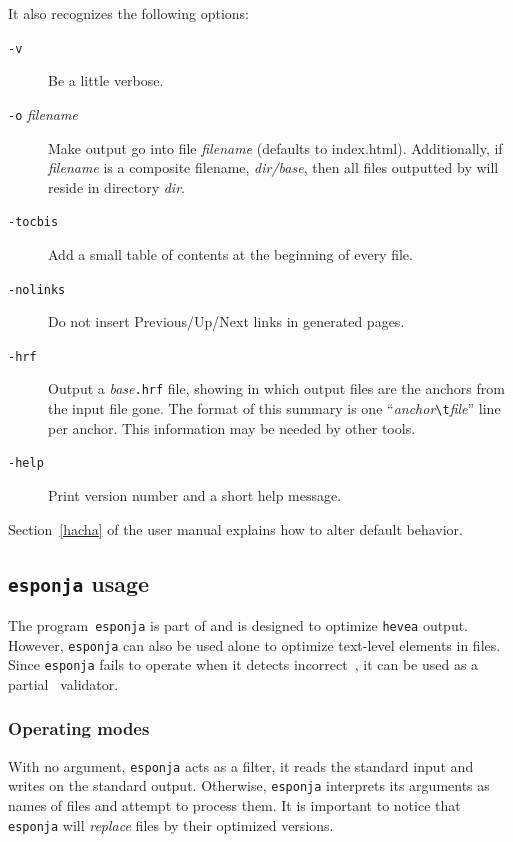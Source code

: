 It also recognizes the following options:
\begin{description}
\item[{\tt -v}] Be a little verbose.
\item[{\tt -o} {\it filename}] Make \hacha{} output go into file
\textit{filename} (defaults  to index.html).
Additionally, if \textit{filename} is a composite filename,
\textit{dir/base}, then all files outputted by \hacha{} will
reside in directory \textit{dir}.
\item[{\tt -tocbis}] Add a small table of contents at the beginning of every file.
\item[{\tt -nolinks}] Do not insert Previous/Up/Next links in
generated pages.
\item[{\tt -hrf}] Output a \textit{base}\texttt{.hrf} file, showing
in which output files are the anchors from the input file gone.
The format of this summary is one
``\textit{anchor}\verb+\t+\textit{file}'' line per anchor.
This information may be needed by other tools.
\item[{\tt -help}] Print version number and a short help message.
\end{description}

\noindent Section~\ref{hacha} of the user manual explains how to
alter \hacha{} default behavior.

\subsection{\texttt{esponja} usage}\label{esponjausage}
The program~\texttt{esponja}
is part of \hevea{} and is designed to optimize \texttt{hevea}
output.
However, \texttt{esponja} can also be used alone to optimize
text-level elements in \html{} files.
Since \texttt{esponja} fails
to operate when it detects incorrect~\html, it can be used as a
partial \html~validator.


\subsubsection{Operating modes}
With no argument, \texttt{esponja} acts as a filter, it reads the
standard input and writes on the standard output.
Otherwise, \texttt{esponja} interprets its arguments as names of
files and attempt to process them.
It is important to notice that \texttt{esponja} will \emph{replace} files
by their optimized versions.


